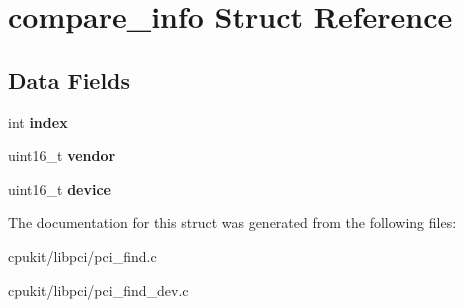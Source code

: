 \hypertarget{structcompare__info}{}\section{compare\+\_\+info Struct Reference}
\label{structcompare__info}
\subsection*{Data Fields}
\begin{DoxyCompactItemize}
\item 
\mbox{\label{structcompare__info_a4baa64bee7d4549383a60b06812591ac}} 
int {\bfseries index}
\item 
\mbox{\label{structcompare__info_a2280d2d3bb595598aa2d80b9a331f183}} 
uint16\+\_\+t {\bfseries vendor}
\item 
\mbox{\label{structcompare__info_ab856dd84bc57fc25150001a036a379b8}} 
uint16\+\_\+t {\bfseries device}
\end{DoxyCompactItemize}


The documentation for this struct was generated from the following files\+:\begin{DoxyCompactItemize}
\item 
cpukit/libpci/pci\+\_\+find.\+c\item 
cpukit/libpci/pci\+\_\+find\+\_\+dev.\+c\end{DoxyCompactItemize}
